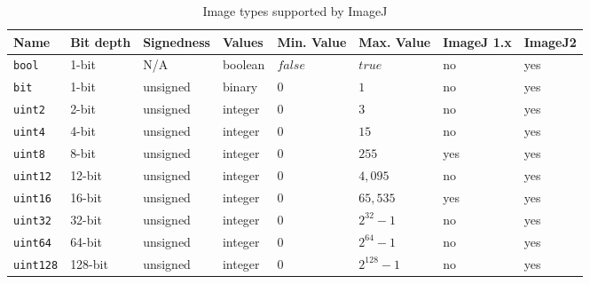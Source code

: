 \documentclass{bmcart}
\begin{document}
\begin{backmatter}
  \begin{table}[h!]
    \caption{Image types supported by ImageJ}
    \begin{tabular}{| l | l | l | p{0.4in} | p{0.8in} | p{0.8in} | l | l |}
      \hline
      \textbf{Name}        & \textbf{Bit depth} & \textbf{Signedness} & \textbf{Values} & \textbf{Min. Value}     & \textbf{Max. Value}    & \textbf{ImageJ 1.x} & \textbf{ImageJ2} \\ \hline
      \texttt{bool}        & 1-bit              & N/A                 & boolean         & $false$                 & $true$                 & no                  & yes              \\ \hline
      \texttt{bit}         & 1-bit              & unsigned            & binary          & $0$                     & $1$                    & no                  & yes              \\ \hline
      \texttt{uint2}       & 2-bit              & unsigned            & integer         & $0$                     & $3$                    & no                  & yes              \\ \hline
      \texttt{uint4}       & 4-bit              & unsigned            & integer         & $0$                     & $15$                   & no                  & yes              \\ \hline
      \texttt{uint8}       & 8-bit              & unsigned            & integer         & $0$                     & $255$                  & yes                 & yes              \\ \hline
      \texttt{uint12}      & 12-bit             & unsigned            & integer         & $0$                     & $4,095$                & no                  & yes              \\ \hline
      \texttt{uint16}      & 16-bit             & unsigned            & integer         & $0$                     & $65,535$               & yes                 & yes              \\ \hline
      \texttt{uint32}      & 32-bit             & unsigned            & integer         & $0$                     & $2^{32} - 1$           & no                  & yes              \\ \hline
      \texttt{uint64}      & 64-bit             & unsigned            & integer         & $0$                     & $2^{64} - 1$           & no                  & yes              \\ \hline
      \texttt{uint128}     & 128-bit            & unsigned            & integer         & $0$                     & $2^{128} - 1$          & no                  & yes              \\ \hline

\end{tabular}
\end{table}
\end{backmatter}
\end{document}
